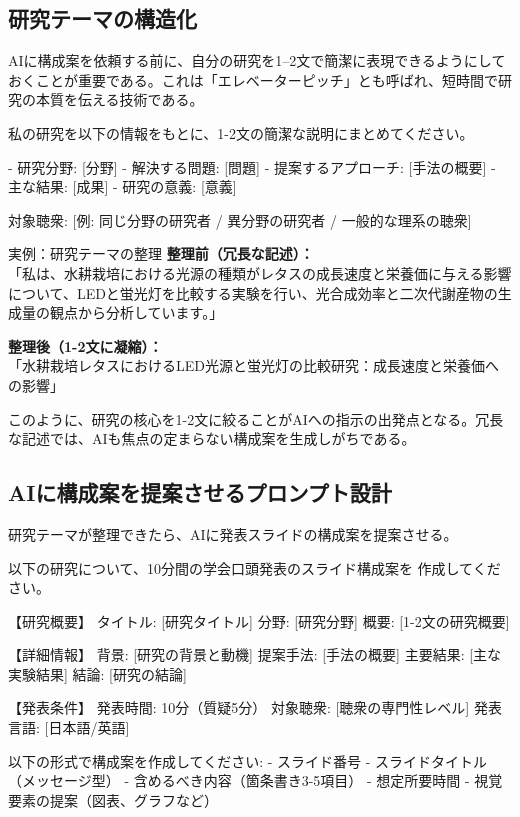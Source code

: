 \subsection{研究テーマの構造化}

AIに構成案を依頼する前に、自分の研究を1--2文で簡潔に表現できるようにしておくことが重要である。これは「エレベーターピッチ」とも呼ばれ、短時間で研究の本質を伝える技術である。

\begin{promptbox}
私の研究を以下の情報をもとに、1-2文の簡潔な説明にまとめてください。

- 研究分野: [分野]
- 解決する問題: [問題]
- 提案するアプローチ: [手法の概要]
- 主な結果: [成果]
- 研究の意義: [意義]

対象聴衆: [例: 同じ分野の研究者 / 異分野の研究者 / 一般的な理系の聴衆]
\end{promptbox}

\begin{itembox}[l]{実例：研究テーマの整理}
\textbf{整理前（冗長な記述）：}\\
「私は、水耕栽培における光源の種類がレタスの成長速度と栄養価に与える影響について、LEDと蛍光灯を比較する実験を行い、光合成効率と二次代謝産物の生成量の観点から分析しています。」

\vspace{2mm}
\textbf{整理後（1-2文に凝縮）：}\\
「水耕栽培レタスにおけるLED光源と蛍光灯の比較研究：成長速度と栄養価への影響」
\end{itembox}

このように、研究の核心を1-2文に絞ることがAIへの指示の出発点となる。冗長な記述では、AIも焦点の定まらない構成案を生成しがちである。

\subsection{AIに構成案を提案させるプロンプト設計}

研究テーマが整理できたら、AIに発表スライドの構成案を提案させる。

\begin{promptbox}
以下の研究について、10分間の学会口頭発表のスライド構成案を
作成してください。

【研究概要】
タイトル: [研究タイトル]
分野: [研究分野]
概要: [1-2文の研究概要]

【詳細情報】
背景: [研究の背景と動機]
提案手法: [手法の概要]
主要結果: [主な実験結果]
結論: [研究の結論]

【発表条件】
発表時間: 10分（質疑5分）
対象聴衆: [聴衆の専門性レベル]
発表言語: [日本語/英語]

以下の形式で構成案を作成してください:
- スライド番号
- スライドタイトル（メッセージ型）
- 含めるべき内容（箇条書き3-5項目）
- 想定所要時間
- 視覚要素の提案（図表、グラフなど）
\end{promptbox}

